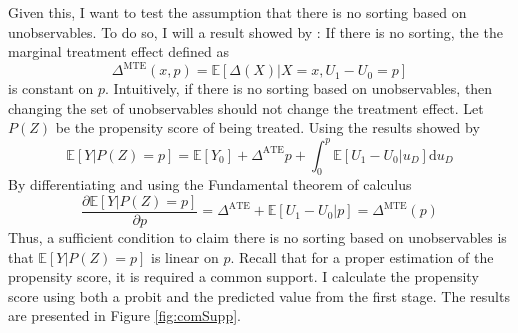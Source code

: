 Given this, I want to test the assumption that there is no sorting based on unobservables. To do so, I will a result showed by \citet{Heckman05}: If there is no sorting, the the marginal treatment effect defined as 
\begin{equation*}
    \Delta^{\text{MTE}}(x,p) = \mathbb{E}\left[\Delta(X)\vert X=x, U_1-U_0=p\right]
\end{equation*}
is constant on $p$. Intuitively, if there is no sorting based on unobservables, then  changing  the set of unobservables should not change the treatment effect. Let $P(Z)$ be the propensity score of being treated. Using the results showed by \citet{Heckman05}
\begin{equation}\label{eq:func}
    \mathbb{E}[Y\vert P(Z)=p] = \mathbb{E}[Y_0] + \Delta^{\text{ATE}}p + \int_0^p\mathbb{E}[U_1-U_0\vert u_D]\mathrm{d}u_D
\end{equation}
By differentiating and using the Fundamental theorem of calculus
\begin{equation*}
    \frac{\partial\mathbb{E}[Y\vert P(Z)=p]}{\partial p} = \Delta^{\text{ATE}}+\mathbb{E}[U_1-U_0\vert p] = \Delta^{\text{MTE}}(p) 
\end{equation*}
Thus, a sufficient condition to claim there is no sorting based on unobservables is that $\mathbb{E}[Y\vert P(Z)=p]$ is linear on $p$. Recall that for a proper estimation of the propensity score, it is required a common support. I calculate the propensity score using both a probit and the predicted value from the first stage. The results are presented in Figure \ref{fig:comSupp}.
